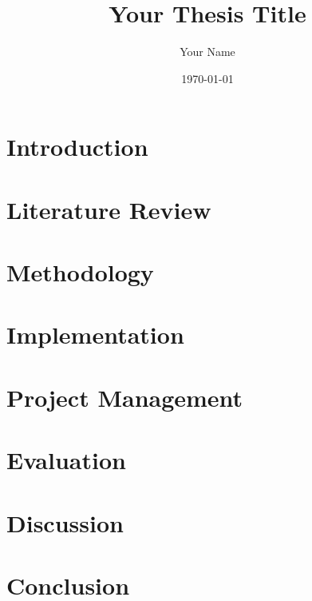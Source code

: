 \documentclass{report}
\title{Your Thesis Title}
\author{Your Name}
\date{\today}
\begin{document}
\maketitle

\begin{abstract}
\end{abstract}

\tableofcontents

\chapter{Introduction}

\chapter{Literature Review}


\chapter{Methodology}


\chapter{Implementation}


\chapter{Project Management}

\chapter{Evaluation}


\chapter{Discussion}

\chapter{Conclusion}
\end{document}
